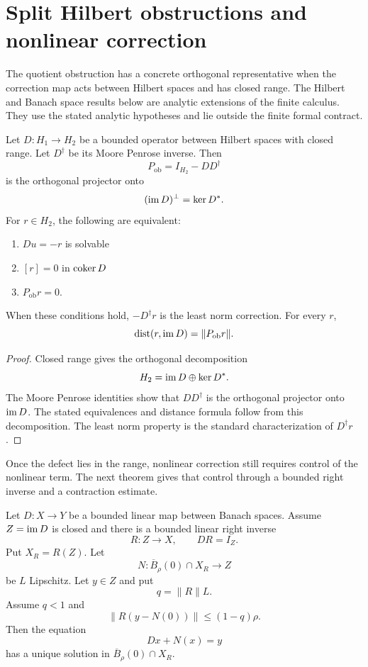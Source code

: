 \section{Split Hilbert obstructions and nonlinear correction}\label{sec:split_obstruction}

The quotient obstruction has a concrete orthogonal representative when the correction map acts between Hilbert spaces and has closed range. The Hilbert and Banach space results below are analytic extensions of the finite calculus. They use the stated analytic hypotheses and lie outside the finite formal contract.

\begin{theorem}\label{thm:orthogonal_obstruction}
Let $D:H_1\to H_2$ be a bounded operator between Hilbert spaces with closed range.  Let $D^\dagger$ be its Moore Penrose inverse.  Then
\[
P_{\mathrm{ob}}=I_{H_2}-DD^\dagger
\]
is the orthogonal projector onto
\[
(\operatorname{im} D)^\perp=\operatorname{ker} D^*.
\]
For $r\in H_2$, the following are equivalent:
\begin{enumerate}
\item $Du=-r$ is solvable
\item $[r]=0$ in $\operatorname{coker} D$
\item $P_{\mathrm{ob}}r=0$.
\end{enumerate}
When these conditions hold, $-D^\dagger r$ is the least norm correction.  For every $r$,
\[
\operatorname{dist}(r,\operatorname{im} D)=\|P_{\mathrm{ob}}r\|.
\]
\end{theorem}

\begin{proof}
Closed range gives the orthogonal decomposition
\[
H_2=\operatorname{im} D\oplus\operatorname{ker} D^*.
\]
The Moore Penrose identities show that $DD^\dagger$ is the orthogonal projector onto $\operatorname{im} D$.  The stated equivalences and distance formula follow from this decomposition.  The least norm property is the standard characterization of $D^\dagger r$.
\end{proof}

Once the defect lies in the range, nonlinear correction still requires control of the nonlinear term. The next theorem gives that control through a bounded right inverse and a contraction estimate.

\begin{theorem}\label{thm:right_inverse_correction}
Let $D:X\to Y$ be a bounded linear map between Banach spaces.  Assume $Z=\operatorname{im} D$ is closed and there is a bounded linear right inverse
\[
R:Z\longrightarrow X,
\qquad
DR=I_Z.
\]
Put $X_R=R(Z)$.  Let
\[
N:\overline B_\rho(0)\cap X_R\longrightarrow Z
\]
be $L$ Lipschitz.  Let $y\in Z$ and put
\[
q=\|R\|L.
\]
Assume $q<1$ and
\[
\|R(y-N(0))\|
\le
(1-q)\rho.
\]
Then the equation
\[
Dx+N(x)=y
\]
has a unique solution in $\overline B_\rho(0)\cap X_R$.
\end{theorem}

